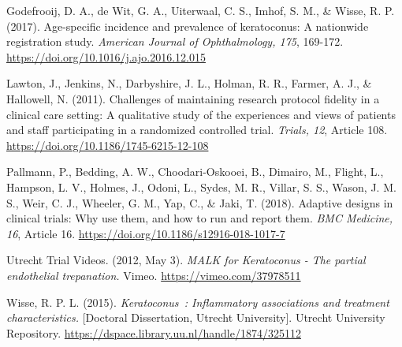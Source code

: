 \documentclass[authordate, reflection]{jote-new-article}
\begin{document}
	Godefrooij, D. A., de Wit, G. A., Uiterwaal, C. S., Imhof, S. M., \& Wisse, R. P. (2017). Age-specific incidence and prevalence of keratoconus: A nationwide registration study. \emph{American Journal of Ophthalmology, 175}, 169-172. \url{https://doi.org/10.1016/j.ajo.2016.12.015}



	Lawton, J., Jenkins, N., Darbyshire, J. L., Holman, R. R., Farmer, A. J., \& Hallowell, N. (2011). Challenges of maintaining research protocol fidelity in a clinical care setting: A qualitative study of the experiences and views of patients and staff participating in a randomized controlled trial. \emph{Trials, 12}, Article 108. \url{https://doi.org/10.1186/1745-6215-12-108}



	Pallmann, P., Bedding, A. W., Choodari-Oskooei, B., Dimairo, M., Flight, L., Hampson, L. V., Holmes, J., Odoni, L., Sydes, M. R., Villar, S. S., Wason, J. M. S., Weir, C. J., Wheeler, G. M., Yap, C., \& Jaki, T. (2018). Adaptive designs in clinical trials: Why use them, and how to run and report them. \emph{BMC Medicine, 16}, Article 16. \url{https://doi.org/10.1186/s12916-018-1017-7}



	Utrecht Trial Videos. (2012, May 3). \emph{MALK for Keratoconus - The partial endothelial trepanation.} Vimeo. \url{https://vimeo.com/37978511}



	Wisse, R. P. L. (2015). \emph{Keratoconus : Inflammatory associations and treatment characteristics.} [Doctoral Dissertation, Utrecht University]. Utrecht University Repository. \url{https://dspace.library.uu.nl/handle/1874/325112}
\end{document}

